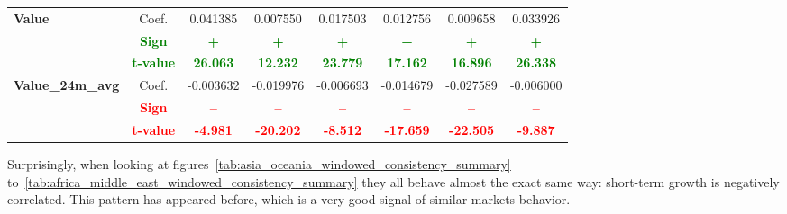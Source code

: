 \documentclass[11pt,english,a4paper,hidelinks]{book}
\begin{document}
\begin{table}[H]
\begin{tabular}{lccccccc}
        \multirow{3}{*}{\textbf{Value}}
            & Coef.   & 0.041385  & 0.007550  & 0.017503  & 0.012756  & 0.009658  & 0.033926  \\
            & \textbf{\textcolor{green}{Sign}}    & \textbf{\textcolor{green}{+}}        & \textbf{\textcolor{green}{+}}        & \textbf{\textcolor{green}{+}}        & \textbf{\textcolor{green}{+}}        & \textbf{\textcolor{green}{+}}        & \textbf{\textcolor{green}{+}}        \\
            & \textbf{\textcolor{green}{t-value}} & \textbf{\textcolor{green}{26.063}}   & \textbf{\textcolor{green}{12.232}}   & \textbf{\textcolor{green}{23.779}}   & \textbf{\textcolor{green}{17.162}}   & \textbf{\textcolor{green}{16.896}}   & \textbf{\textcolor{green}{26.338}}   \\
        \multirow{3}{*}{\textbf{Value\_24m\_avg}} 
            & Coef.   & -0.003632 & -0.019976 & -0.006693 & -0.014679 & -0.027589 & -0.006000 \\
            & \textbf{\textcolor{red}{Sign}}    & \textbf{\textcolor{red}{–}}         & \textbf{\textcolor{red}{–}}         & \textbf{\textcolor{red}{–}}         & \textbf{\textcolor{red}{–}}         & \textbf{\textcolor{red}{–}}         & \textbf{\textcolor{red}{–}}         \\
            & \textbf{\textcolor{red}{t-value}} & \textbf{\textcolor{red}{-4.981}}    & \textbf{\textcolor{red}{-20.202}}   & \textbf{\textcolor{red}{-8.512}}    & \textbf{\textcolor{red}{-17.659}}   & \textbf{\textcolor{red}{-22.505}}   & \textbf{\textcolor{red}{-9.887}}    \\
        \bottomrule
    \end{tabular}
    \label{tab:europe_windowed_consistency_summary}
\end{table}

\noindent Surprisingly, when looking at figures~\ref{tab:asia_oceania_windowed_consistency_summary} to~\ref{tab:africa_middle_east_windowed_consistency_summary}  they all behave almost the exact same way: short-term growth is negatively correlated. This pattern has appeared before, which is a very good signal of similar markets behavior.
\end{document}
